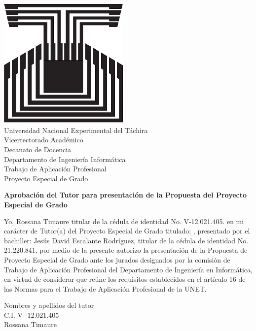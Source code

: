 \chapter*{}
\pagestyle{empty}
\thispagestyle{empty}


\begin{center}
\includegraphics[scale=0.2]{unet.jpg}\\

Universidad Nacional Experimental del T\'achira\\

Vicerrectorado Acad\'emico\\

Decanato de Docencia\\

Departamento de Ingenier\'ia Inform\'atica\\

Trabajo de Aplicaci\'on Profesional\\

Proyecto Especial de Grado\\

\end{center}

\begin{center}
\textbf{Aprobaci\'on del Tutor para presentaci\'on de la Propuesta del Proyecto Especial de Grado}
\end{center}

	Yo,  Rossana Timaure  titular de la c\'edula de identidad No. V-12.021.405.  en mi car\'acter de Tutor(a) del Proyecto Especial de Grado titulado: , presentado por el bachiller: Jes\'us David Escalante Rodr\'iguez, titular de la c\'edula de identidad No. 21.220.841, por medio de la presente autorizo la presentaci\'on de la Propuesta de Proyecto Especial de Grado ante los jurados designados por la comisi\'on de Trabajo de Aplicaci\'on Profesional del Departamento de Ingenier\'ia en Inform\'atica, en virtud de considerar que re\'une los requisitos establecidos en el art\'iculo 16 de las Normas para el Trabajo de Aplicaci\'on Profesional de la UNET.\\
	
	
	\begin{center}
	Nombres y apellidos del tutor\\
	
	C.I. V- 12.021.405\\
Rossana Timaure\\
	\end{center}